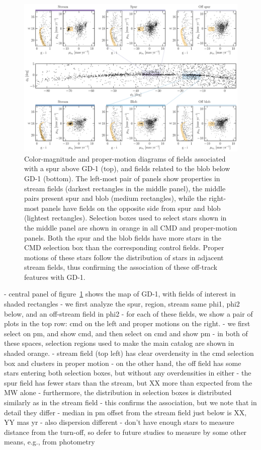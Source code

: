 \documentclass[modern]{aastex62}
\begin{document}
\begin{figure}
\begin{center}
\includegraphics[width=\textwidth]{features.pdf}
\end{center}
\caption{
Color-magnitude and proper-motion diagrams of fields associated with a spur above GD-1 (top), and fields related to the blob below GD-1 (bottom).
The left-most pair of panels show properties in stream fields (darkest rectangles in the middle panel), the middle pairs present spur and blob (medium rectangles), while the right-most panels have fields on the opposite side from spur and blob (lightest rectangles).
Selection boxes used to select stars shown in the middle panel are shown in orange in all CMD and proper-motion panels.
Both the spur and the blob fields have more stars in the CMD selection box than the corresponding control fields.
Proper motions of these stars follow the distribution of stars in adjacent stream fields, thus confirming the association of these off-track features with GD-1.
}
\label{fig:features}
\end{figure}

- central panel of figure~\ref{fig:features} shows the map of GD-1, with fields of interest in shaded rectangles
- we first analyze the spur, region, stream same phi1, phi2 below, and an off-stream field in phi2
- for each of these fields, we show a pair of plots in the top row: cmd on the left and proper motions on the right. 
- we first select on pm, and show cmd, and then select on cmd and show pm
- in both of these spaces, selection regions used to make the main catalog are shown in shaded orange.
- stream field (top left) has clear overdensity in the cmd selection box and clusters in proper motion
- on the other hand, the off field has some stars entering both selection boxes, but without any overdensities in either
- the spur field has fewer stars than the stream, but XX more than expected from the MW alone
- furthermore, the distribution in selection boxes is distributed similarly as in the stream field
- this confirms the association, but we note that in detail they differ
- median in pm offset from the stream field just below is XX, YY mas yr
- also dispersion different
- don't have enough stars to measure distance from the turn-off, so defer to future studies to measure by some other means, e.g., from photometry
\end{document}
